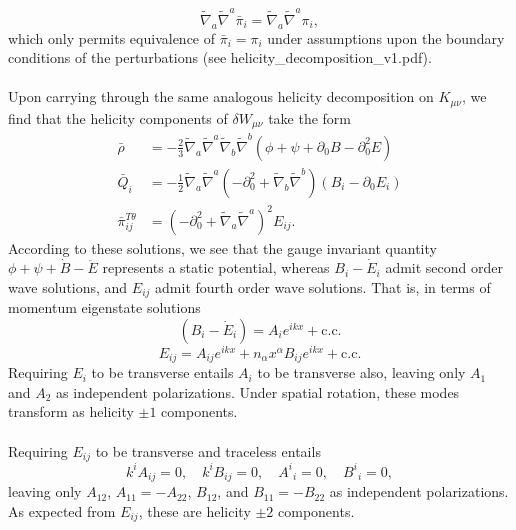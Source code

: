 \documentclass[10pt,letterpaper]{article}
\begin{document}
\begin{equation}
\tilde\nabla_a\tilde\nabla^a \bar \pi_i = \tilde\nabla_a \tilde\nabla^a \pi_i,
\end{equation}
which only permits equivalence of $\bar\pi_i = \pi_i$ under assumptions upon the boundary conditions of the perturbations (see helicity\_decomposition\_v1.pdf). 
\\ \\
Upon carrying through the same analogous helicity decomposition on $K_{\mu\nu}$, we find that the helicity components of $\delta W_{\mu\nu}$ take the form
\begin{align}
\bar \rho &= -\frac{2}{3} \tilde{\nabla}_a\tilde{\nabla}^a\tilde{\nabla}_b\tilde{\nabla}^b (\phi + \psi +\partial_0{B}-\partial_0^2{E}) 
\nonumber\\
\bar Q_i &= -\frac{1}{2} \tilde{\nabla}_a\tilde{\nabla}^a\left(-\partial_0^2+\tilde{\nabla}_b\tilde{\nabla}^b\right)(B_i - \partial_0{E}_i)
\nonumber \\
\bar \pi_{ij}^{T\theta} &= \left(-\partial_0^2 + \tilde\nabla_a\tilde\nabla^a\right)^2 E_{ij}.
\end{align}
According to these solutions, we see that the gauge invariant quantity $\phi +\psi + \dot B - \ddot E$ represents a static potential, whereas $B_i - \dot E_i$ admit second order wave solutions, and $E_{ij}$ admit fourth order wave solutions. That is, in terms of momentum eigenstate solutions
\begin{equation}
	(B_i - \dot E_i) = A_i e^{ikx} + \text{c.c.}
\end{equation}
\begin{equation}
E_{ij} = A_{ij}e^{ikx} + n_\alpha x^\alpha B_{ij} e^{ikx} +\text{c.c.}
\end{equation}
Requiring $E_i$ to be transverse entails $A_i$ to be transverse also, leaving only $A_1$ and $A_2$ as independent polarizations. Under spatial rotation, these modes transform as helicity $\pm 1$ components. 
\\ \\
Requiring $E_{ij}$ to be transverse and traceless entails
\begin{equation}
k^i A_{ij} = 0,\quad k^iB_{ij} = 0,\quad A^i{}_i = 0,\quad B^i{}_i = 0,
\end{equation}
leaving only $A_{12}$, $A_{11} = -A_{22}$, $B_{12}$, and $B_{11} = -B_{22}$ as independent polarizations. As expected from $E_{ij}$, these are helicity $\pm 2$ components. 
\end{document}
